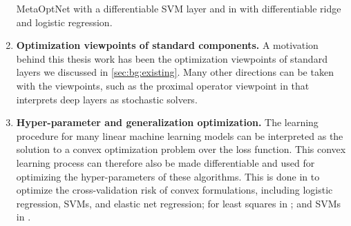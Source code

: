 \begin{enumerate}
  MetaOptNet \citep{lee2019meta} with a differentiable SVM layer
  and in \citet{bertinetto2018meta} with differentiable ridge
  and logistic regression.
\item \textbf{Optimization viewpoints of standard components.}
  A motivation behind this thesis work has been the optimization
  viewpoints of standard layers we discussed in \cref{sec:bg:existing}.
  Many other directions can be taken with the viewpoints, such
  as the proximal operator viewpoint in \citet{bibi2018deep}
  that interprets deep layers as stochastic solvers.
\item \textbf{Hyper-parameter and generalization optimization.}
  The learning procedure for many linear machine learning models
  can be interpreted as the solution to a convex
  optimization problem over the loss function.
  This convex learning process can therefore also be
  made differentiable and used for optimizing the hyper-parameters
  of these algorithms. This is done in
  \citet{barratt2018optimizing} to optimize the cross-validation
  risk of convex formulations, including logistic regression,
  SVMs, and elastic net regression;
  for least squares in \citet{barratt2019least};
  and SVMs in \citet{lee2019meta}.
\end{enumerate}

